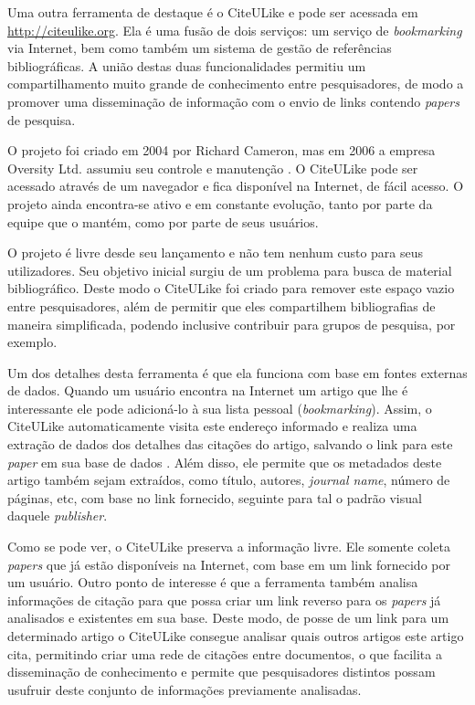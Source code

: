 Uma outra ferramenta de destaque é o CiteULike \cite{citeulike} e pode ser acessada em \url{http://citeulike.org}. Ela é uma fusão de dois serviços: um serviço de \emph{bookmarking} via Internet, bem como também um sistema de gestão de referências bibliográficas. A união destas duas funcionalidades permitiu um compartilhamento muito grande de conhecimento entre pesquisadores, de modo a promover uma disseminação de informação com o envio de links contendo \emph{papers} de pesquisa. 

O projeto foi criado em 2004 por Richard Cameron, mas em 2006 a empresa Oversity Ltd. assumiu seu controle e manutenção \cite{CiteULike-FAQ}. O CiteULike pode ser acessado através de um navegador e fica disponível na Internet, de fácil acesso. O projeto ainda encontra-se ativo e em constante evolução, tanto por parte da equipe que o mantém, como por parte de seus usuários.

O projeto é livre desde seu lançamento e não tem nenhum custo para seus utilizadores. Seu objetivo inicial surgiu de um problema para busca de material bibliográfico. Deste modo o CiteULike foi criado para remover este espaço vazio entre pesquisadores, além de permitir que eles compartilhem bibliografias de maneira simplificada, podendo inclusive contribuir para grupos de pesquisa, por exemplo.

Um dos detalhes desta ferramenta é que ela funciona com base em fontes externas de dados. Quando um usuário encontra na Internet um artigo que lhe é interessante ele pode adicioná-lo à sua lista pessoal (\emph{bookmarking}). Assim, o CiteULike automaticamente visita este endereço informado e realiza uma extração de dados dos detalhes das citações do artigo, salvando o link para este \emph{paper} em sua base de dados \cite{citeulike}. Além disso, ele permite que os metadados deste artigo também sejam extraídos, como título, autores, \emph{journal name}, número de páginas, etc, com base no link fornecido, seguinte para tal o padrão visual daquele \emph{publisher}.

Como se pode ver, o CiteULike preserva a informação livre. Ele somente coleta \emph{papers} que já estão disponíveis na Internet, com base em um link fornecido por um usuário. Outro ponto de interesse é que a ferramenta também analisa informações de citação para que possa criar um link reverso para os \emph{papers} já analisados e existentes em sua base. Deste modo, de posse de um link para um determinado artigo o CiteULike consegue analisar quais outros artigos este artigo cita, permitindo criar uma rede de citações entre documentos, o que facilita a disseminação de conhecimento e permite que pesquisadores distintos possam usufruir deste conjunto de informações previamente analisadas.

